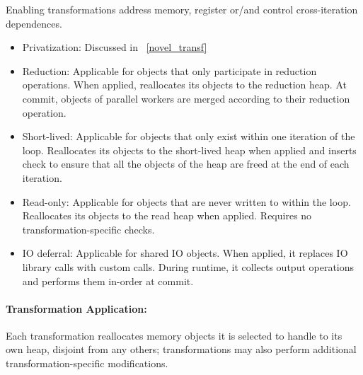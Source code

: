 Enabling transformations address memory, register or/and control
cross-iteration dependences.

\begin{itemize}
%
\item Privatization: Discussed in ~\ref{novel_transf}

\item Reduction: Applicable for objects that only participate in
reduction operations. When applied, reallocates
its objects to the reduction heap. At commit, objects of parallel
workers are merged according to their reduction operation.




\item Short-lived: Applicable for objects that only exist within one
iteration of the loop. Reallocates its objects to the
short-lived heap when applied and inserts check to ensure that all
the objects of the heap are freed at the end of each iteration.

\item Read-only: Applicable for objects that are never written to within
the loop. Reallocates its objects to the read heap when applied. Requires no
transformation-specific checks.

\item IO deferral: Applicable for shared IO objects. When applied, it
replaces IO library calls with custom calls. During runtime, it
collects output operations and performs them in-order at commit.

\end{itemize}

\paragraph{Transformation Application:}
Each transformation reallocates
memory objects it is selected to handle
to its own heap, disjoint from any others; transformations may also
perform additional transformation-specific modifications.

